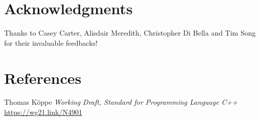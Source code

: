 \documentclass{wg21}
\begin{document}
\section{Acknowledgments}

Thanks to Casey Carter, Alisdair Meredith, Christopher Di Bella and Tim Song for their invaluable feedbacks!

\section{References}
\renewcommand{\section}[2]{}%



\begin{thebibliography}{9}

Thomas Köppe
\emph{Working Draft, Standard for Programming Language C++}\newline
\url{https://wg21.link/N4901}


\end{thebibliography}
\end{document}
